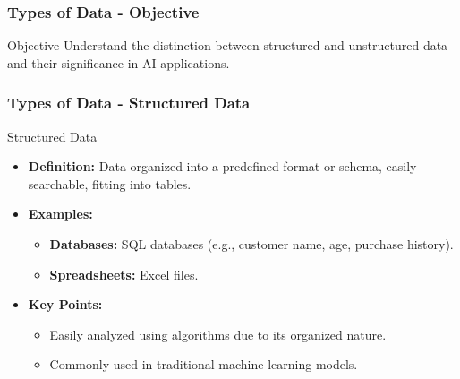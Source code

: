 \documentclass[aspectratio=169]{beamer}
\begin{document}
\begin{frame}[fragile]
    \frametitle{Types of Data - Objective}
    \begin{block}{Objective}
        Understand the distinction between structured and unstructured data and their significance in AI applications.
    \end{block}
\end{frame}

\begin{frame}[fragile]
    \frametitle{Types of Data - Structured Data}
    \begin{block}{Structured Data}
        \begin{itemize}
            \item \textbf{Definition:} Data organized into a predefined format or schema, easily searchable, fitting into tables.
            \item \textbf{Examples:}
            \begin{itemize}
                \item \textbf{Databases:} SQL databases (e.g., customer name, age, purchase history).
                \item \textbf{Spreadsheets:} Excel files.
            \end{itemize}
            \item \textbf{Key Points:}
            \begin{itemize}
                \item Easily analyzed using algorithms due to its organized nature.
                \item Commonly used in traditional machine learning models.
            \end{itemize}
        \end{itemize}
    \end{block}
\end{frame}
\end{document}
